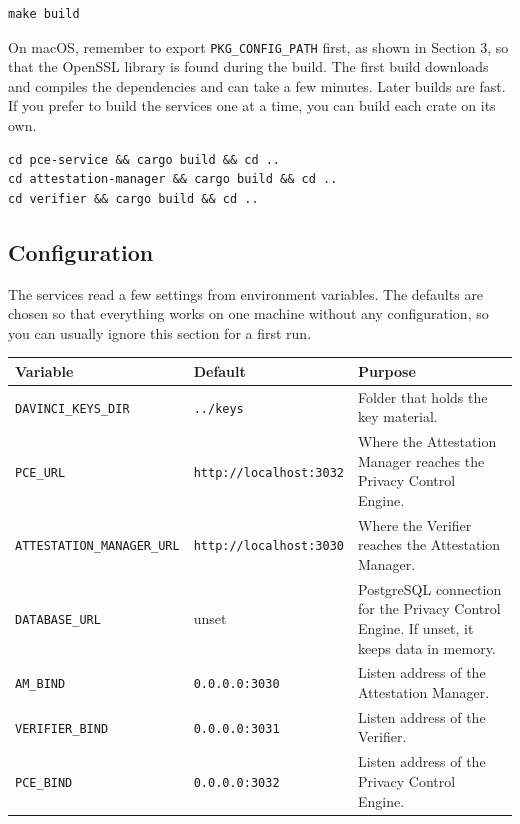 \documentclass[11pt,a4paper]{article}
\begin{document}
\begin{lstlisting}
make build
\end{lstlisting}

On macOS, remember to export \texttt{PKG\_CONFIG\_PATH} first, as shown in
Section 3, so that the OpenSSL library is found during the build. The first build
downloads and compiles the dependencies and can take a few minutes. Later builds
are fast. If you prefer to build the services one at a time, you can build each
crate on its own.

\begin{lstlisting}
cd pce-service && cargo build && cd ..
cd attestation-manager && cargo build && cd ..
cd verifier && cargo build && cd ..
\end{lstlisting}

\subsection{Configuration}

The services read a few settings from environment variables. The defaults are
chosen so that everything works on one machine without any configuration, so you
can usually ignore this section for a first run.

\begin{center}
\footnotesize
\begin{tabularx}{\textwidth}{>{\raggedright\arraybackslash}p{} >{\raggedright\arraybackslash}p{} X}
\toprule
\textbf{Variable} & \textbf{Default} & \textbf{Purpose}\\
\midrule
\texttt{DAVINCI\_KEYS\_DIR} & \texttt{../keys} & Folder that holds the key material.\\
\texttt{PCE\_URL} & \texttt{http://localhost:3032} & Where the Attestation Manager reaches the Privacy Control Engine.\\
\texttt{ATTESTATION\_MANAGER\_URL} & \texttt{http://localhost:3030} & Where the Verifier reaches the Attestation Manager.\\
\texttt{DATABASE\_URL} & unset & PostgreSQL connection for the Privacy Control Engine. If unset, it keeps data in memory.\\
\texttt{AM\_BIND} & \texttt{0.0.0.0:3030} & Listen address of the Attestation Manager.\\
\texttt{VERIFIER\_BIND} & \texttt{0.0.0.0:3031} & Listen address of the Verifier.\\
\texttt{PCE\_BIND} & \texttt{0.0.0.0:3032} & Listen address of the Privacy Control Engine.\\
\bottomrule
\end{tabularx}
\end{center}
\end{document}
